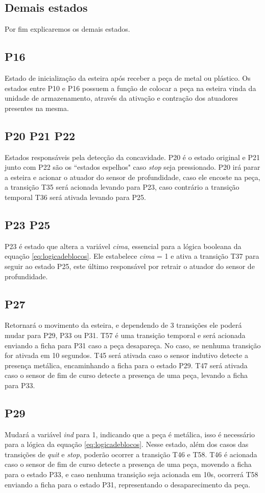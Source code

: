 \documentclass[a4paper,twoside]{articlewithlogo}
\begin{document}
\subsection{Demais estados} Por fim explicaremos os demais estados.

\subsection*{P16} Estado de inicialização da esteira após receber a peça de metal ou plástico. Os estados entre P10 e P16 possuem a função de colocar a peça na esteira vinda da unidade de armazenamento, através da ativação e contração dos atuadores presentes na mesma.

\subsection*{P20 P21 P22} Estados responsáveis pela detecção da concavidade. P20 é o estado original e P21 junto com P22 são os ``estados espelhos" caso \textit{stop} seja pressionado. P20 irá parar a esteira e acionar o atuador do sensor de profundidade, caso ele encoste na peça, a transição T35 será acionada levando para P23, caso contrário a transição temporal T36 será ativada levando para P25. 

\subsection*{P23 P25} P23 é estado que altera a variável \textit{cima}, essencial para a lógica booleana da equação \eqref{eq:logicadeblocos}. Ele estabelece \textit{cima} = 1 e ativa a transição T37 para seguir ao estado P25, este último responsável por retrair o atuador do sensor de profundidade.

\subsection*{P27} Retornará o movimento da esteira, e dependendo de 3 transições ele poderá mudar para P29, P33 ou P31. 
T57 é uma transição temporal e será acionada enviando a ficha para P31 caso a peça desapareça. No caso, se nenhuma transição for ativada em 10 segundos.
T45 será ativada caso o sensor indutivo detecte a presença metálica, encaminhando a ficha para o estado P29.
T47 será ativada caso o sensor de fim de curso detecte a presença de uma peça, levando a ficha para P33.

\subsection*{P29} Mudará a variável \textit{ind} para 1, indicando que a peça é metálica, isso é necessário para a lógica da equação \eqref{eq:logicadeblocos}. Nesse estado, além dos casos das transições de \textit{quit} e \textit{stop}, poderão ocorrer a transição T46 e T58.
T46 é acionada caso o sensor de fim de curso detecte a presença de uma peça, movendo a ficha para o estado P33, e caso nenhuma transição seja acionada em 10s, ocorrerá T58 enviando a ficha para o estado P31, representando o desaparecimento da peça.
\end{document}
